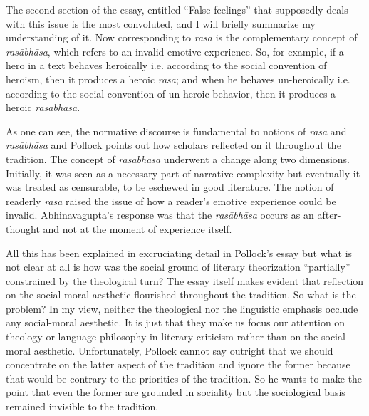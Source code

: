 The second section of the essay, entitled ``False feelings'' that supposedly deals with this issue is the most convoluted, and I will briefly summarize my understanding of it. Now corresponding to \textsl{rasa} is the complementary concept of \textsl{rasābhāsa}, which refers to an invalid emotive experience. So, for example, if a hero in a text behaves heroically i.e. according to the social convention of heroism, then it produces a heroic \textsl{rasa}; and when he behaves un-heroically i.e. according to the social convention of un-heroic behavior, then it produces a heroic \textsl{rasābhāsa}. 

As one can see, the normative discourse is fundamental to notions of \textsl{rasa} and \textsl{rasābhāsa} and Pollock points out how scholars reflected on it throughout the tradition. The concept of \textsl{rasābhāsa} underwent a change along two dimensions. Initially, it was seen as a necessary part of narrative complexity but eventually it was treated as censurable, to be eschewed in good literature. The notion of readerly \textsl{rasa} raised the issue of how a reader's emotive experience could be invalid. Abhinavagupta's response was that the \textsl{rasābhāsa} occurs as an after-thought and not at the moment of experience itself.

All this has been explained in excruciating detail in Pollock's essay but what is not clear at all is how was the social ground of literary theorization ``partially'' constrained by the theological turn? The essay itself makes evident that reflection on the social-moral aesthetic flourished throughout the tradition. So what is the problem? In my view, neither the theological nor the linguistic emphasis occlude any social-moral aesthetic. It is just that they make us focus our attention on theology or language-philosophy in literary criticism rather than on the social-moral aesthetic. Unfortunately, Pollock cannot say outright that we should concentrate on the latter aspect of the tradition and ignore the former because that would be contrary to the priorities of the tradition. So he wants to make the point that even the former are grounded in sociality but the sociological basis remained invisible to the tradition.

